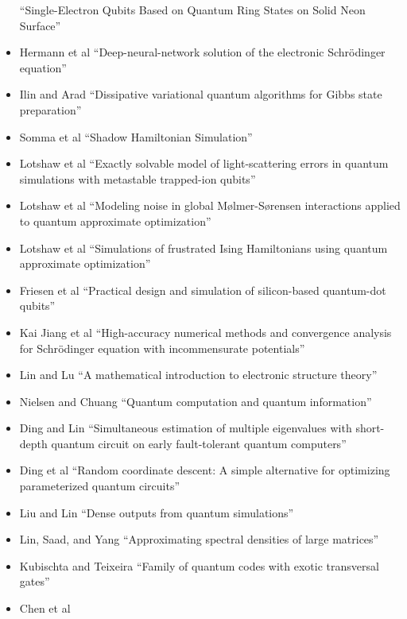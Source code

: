 \documentclass[]{article}
\begin{document}
\begin{itemize}
``Single-Electron Qubits Based on Quantum Ring States on Solid Neon Surface''
\item
Hermann et al\cite{hermann2020deep}
``Deep-neural-network solution of the electronic Schr{\"o}dinger equation''
\item
Ilin and Arad\cite{ilin2024dissipativevariationalquantumalgorithms}
``Dissipative variational quantum algorithms for Gibbs state preparation''
\item
Somma et al\cite{somma2024shadowhamiltoniansimulation}
``Shadow Hamiltonian Simulation''
\item 
Lotshaw et al\cite{PhysRevA.110.L030803}
``Exactly solvable model of light-scattering errors in quantum simulations with metastable trapped-ion qubits''
\item
Lotshaw et al\cite{PhysRevA.107.062406}
``Modeling noise in global M\o{}lmer-S\o{}rensen interactions applied to quantum approximate optimization''
\item
Lotshaw et al\cite{doi:10.1098/rsta.2021.0414}
``Simulations of frustrated Ising Hamiltonians using quantum approximate optimization''
\item Friesen et al\cite{PhysRevB.67.121301}
  ``Practical design and simulation of silicon-based quantum-dot qubits''
\item Kai Jiang et al\cite{jiang2024high}
``High-accuracy numerical methods and convergence analysis for Schr{\"o}dinger equation with incommensurate potentials''
\item Lin and Lu\cite{lin2019mathematical}
``A mathematical introduction to electronic structure theory''
\item Nielsen and Chuang\cite{nielsen2010quantum}
``Quantum computation and quantum information''
\item Ding and Lin\cite{ding2023simultaneous}
``Simultaneous estimation of multiple eigenvalues with short-depth quantum circuit on early fault-tolerant quantum computers''
\item Ding et al\cite{ding2024random}
  ``Random coordinate descent: A simple alternative for optimizing parameterized quantum circuits''
\item Liu and Lin\cite{LIU2024113213}
``Dense outputs from quantum simulations''
\item Lin, Saad, and Yang\cite{lin2016approximating}
``Approximating spectral densities of large matrices''
\item Kubischta and Teixeira\cite{kubischta2023family}
``Family of quantum codes with exotic transversal gates''
\item Chen et al\cite{10628380}

\end{itemize}
\end{document}
